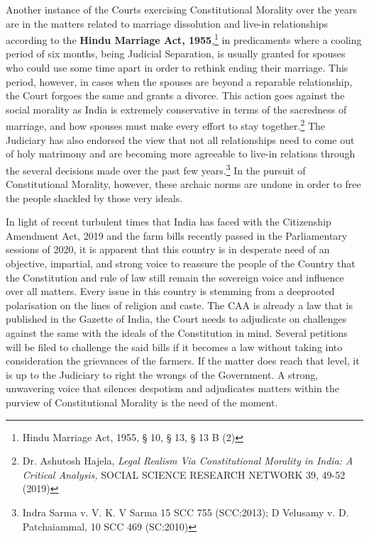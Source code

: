\begin{multicols}{2}
\vspace{-.1cm}

\noi
Another instance of the Courts exercising Constitutional Morality over the years are in the
matters related to marriage dissolution and live-in relationships according to the \textbf{Hindu Marriage Act, 1955},\footnote{Hindu Marriage Act, 1955, § 10, § 13, § 13 B (2)} in predicaments where a cooling period of six months, being Judicial
Separation, is usually granted for spouses who could use some time apart in order to rethink
ending their marriage. This period, however, in cases when the spouses are beyond a
reparable relationship, the Court forgoes the same and grants a divorce. This action goes
against the social morality as India is extremely conservative in terms of the sacredness of
marriage, and how spouses must make every effort to stay together.\footnote{Dr. Ashutosh Hajela, \textit{Legal Realism Via Constitutional Morality in India: A Critical Analysis,} SOCIAL SCIENCE RESEARCH NETWORK 39, 49-52 (2019) } The Judiciary has also endorsed the view that not all relationships need to come out of holy matrimony and are
becoming more agreeable to live-in relations through the several decisions made over the past
few years.\footnote{Indra Sarma v. V. K. V Sarma 15 SCC 755 (SCC:2013); D Velusamy v. D. Patchaiammal, 10 SCC 469
(SC:2010)} In the pursuit of Constitutional Morality, however, these archaic norms are
undone in order to free the people shackled by those very ideals.

\noi
In light of recent turbulent times that India has faced with the Citizenship Amendment Act,
2019 and the farm bills recently passed in the Parliamentary sessions of 2020, it is apparent
that this country is in desperate need of an objective, impartial, and strong voice to reassure
the people of the Country that the Constitution and rule of law still remain the sovereign
voice and influence over all matters. Every issue in this country is stemming from a deeprooted polarisation on the lines of religion and caste. The CAA is already a law that is
published in the Gazette of India, the Court needs to adjudicate on challenges against the
same with the ideals of the Constitution in mind. Several petitions will be filed to challenge
the said bills if it becomes a law without taking into consideration the grievances of the
farmers. If the matter does reach that level, it is up to the Judiciary to right the wrongs of the
Government. A strong, unwavering voice that silences despotism and adjudicates matters
within the purview of Constitutional Morality is the need of the moment.


\end{multicols}
